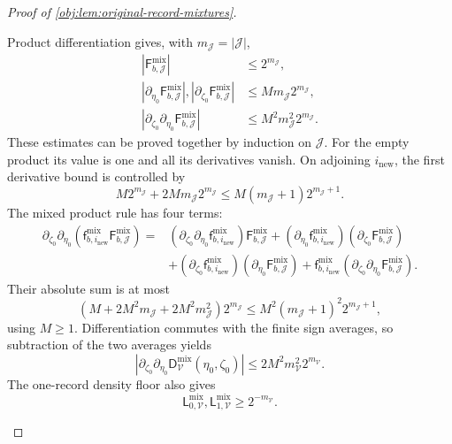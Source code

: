 \begin{proof}[Proof of \cref{obj:lem:original-record-mixtures}]
\begin{enumerate}
Product differentiation gives, with \(m_{\mathcal J}=|\mathcal J|\),
\[
\begin{aligned}
|\mathsf F_{b,\mathcal J}^{\mathrm{mix}}|&\le2^{m_{\mathcal J}},\\
|\partial_{\eta_0}\mathsf F_{b,\mathcal J}^{\mathrm{mix}}|,
|\partial_{\zeta_0}\mathsf F_{b,\mathcal J}^{\mathrm{mix}}|
&\le M m_{\mathcal J}2^{m_{\mathcal J}},\\
|\partial_{\zeta_0}\partial_{\eta_0}
\mathsf F_{b,\mathcal J}^{\mathrm{mix}}|
&\le M^2m_{\mathcal J}^2 2^{m_{\mathcal J}}.
\end{aligned}
\]
These estimates can be proved together by induction on
\(\mathcal J\). For the empty product its value is one and all its
derivatives vanish. On adjoining \(i_{\mathrm{new}}\), the first
derivative bound is controlled by
\[
M2^{m_{\mathcal J}}+
2M m_{\mathcal J}2^{m_{\mathcal J}}
\le
M(m_{\mathcal J}+1)2^{m_{\mathcal J}+1}.
\]
The mixed product rule has four terms:
\[
\begin{aligned}
\partial_{\zeta_0}\partial_{\eta_0}
\left(\mathsf f_{b,i_{\mathrm{new}}}^{\mathrm{mix}}
\mathsf F_{b,\mathcal J}^{\mathrm{mix}}\right)
={}&
(\partial_{\zeta_0}\partial_{\eta_0}
\mathsf f_{b,i_{\mathrm{new}}}^{\mathrm{mix}})
\mathsf F_{b,\mathcal J}^{\mathrm{mix}}
+
(\partial_{\eta_0}\mathsf f_{b,i_{\mathrm{new}}}^{\mathrm{mix}})
(\partial_{\zeta_0}\mathsf F_{b,\mathcal J}^{\mathrm{mix}})\\
&+
(\partial_{\zeta_0}\mathsf f_{b,i_{\mathrm{new}}}^{\mathrm{mix}})
(\partial_{\eta_0}\mathsf F_{b,\mathcal J}^{\mathrm{mix}})
+
\mathsf f_{b,i_{\mathrm{new}}}^{\mathrm{mix}}
(\partial_{\zeta_0}\partial_{\eta_0}
\mathsf F_{b,\mathcal J}^{\mathrm{mix}}).
\end{aligned}
\]
Their absolute sum is at most
\[
\left(M+2M^2m_{\mathcal J}
+2M^2m_{\mathcal J}^2\right)2^{m_{\mathcal J}}
\le
M^2(m_{\mathcal J}+1)^2 2^{m_{\mathcal J}+1},
\]
using \(M\ge1\). Differentiation commutes with the finite sign
averages, so subtraction of the two averages yields
\[
|\partial_{\zeta_0}\partial_{\eta_0}
\mathsf D_{\mathcal V}^{\mathrm{mix}}(\eta_0,\zeta_0)|
\le
2M^2m_{\mathcal V}^2 2^{m_{\mathcal V}}.
\]
The one-record density floor also gives
\[
\mathsf L_{0,\mathcal V}^{\mathrm{mix}},
\mathsf L_{1,\mathcal V}^{\mathrm{mix}}
\ge2^{-m_{\mathcal V}}.
\]


\end{enumerate}
\end{proof}
